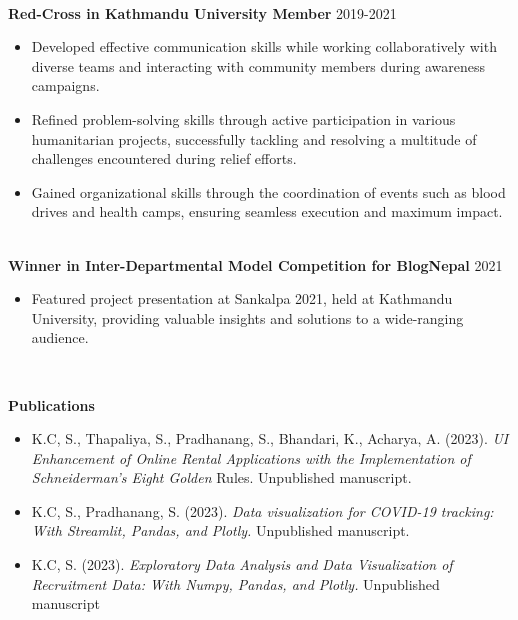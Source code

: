 \documentclass[11pt]{article}
\begin{document}
\\

{\Large\textbf{Red-Cross in Kathmandu University Member } }\hfill2019-2021
\begin{itemize}[noitemsep]
    
    \item Developed effective communication skills while working collaboratively with diverse teams and interacting with community members during awareness campaigns.
    
    \item Refined problem-solving skills through active participation in various humanitarian projects, successfully tackling and resolving a multitude of challenges encountered during relief efforts.


    
    \item Gained organizational skills through the coordination of events such as blood drives and health camps, ensuring seamless execution and maximum impact.
\end{itemize}
\\
{\Large\textbf{Winner in Inter-Departmental Model Competition for BlogNepal}} \hfill2021
\begin{itemize}[noitemsep]
    \item 
Featured project presentation at Sankalpa 2021, held at Kathmandu University, providing valuable insights and solutions to a wide-ranging audience.
    \
\end{itemize}
\\

\begin{center}
    {\Huge\textbf{Publications}}
    
    \begin{itemize}[noitemsep]
    \hrulefill
    \item K.C, S., Thapaliya, S., Pradhanang, S., Bhandari, K., Acharya, A. (2023).\textit{ UI Enhancement of
Online Rental Applications with the Implementation of Schneiderman’s Eight Golden}
Rules. Unpublished manuscript.
    \vspace{5mm}
    \item K.C, S., Pradhanang, S. (2023).\textit{ Data visualization for COVID-19 tracking: With Streamlit,
Pandas, and Plotly.} Unpublished manuscript.

    \vspace{5mm}

     \item K.C, S. (2023).\textit{ Exploratory Data Analysis and Data Visualization of Recruitment Data: With Numpy, Pandas, and Plotly.} Unpublished manuscript


         

\end{itemize} 
\end{center}
\end{document}
